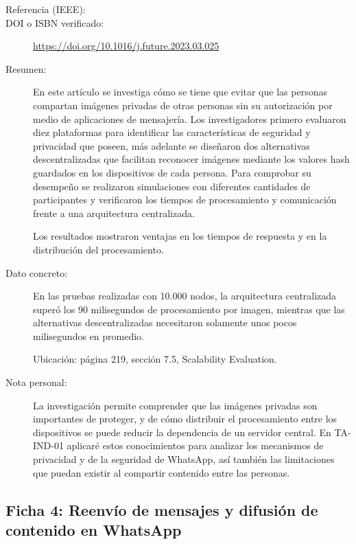 \begin{description}

\item[Referencia (IEEE):]

\item[DOI o ISBN verificado:]
\url{https://doi.org/10.1016/j.future.2023.03.025}

\item[Resumen:]
En este artículo se investiga cómo se tiene que evitar que las personas compartan imágenes privadas de otras personas sin su autorización por medio de aplicaciones de mensajería. Los investigadores primero evaluaron diez plataformas para identificar las características de seguridad y privacidad que poseen, más adelante se diseñaron dos alternativas descentralizadas que facilitan reconocer imágenes mediante los valores hash guardados en los dispositivos de cada persona. Para comprobar su desempeño se realizaron simulaciones con diferentes cantidades de participantes y verificaron los tiempos de procesamiento y comunicación frente a una arquitectura centralizada.

Los resultados mostraron ventajas en los tiempos de respuesta y en la distribución del procesamiento.

\item[Dato concreto:]
En las pruebas realizadas con 10.000 nodos, la arquitectura centralizada superó los 90 milisegundos de procesamiento por imagen, mientras que las alternativas descentralizadas necesitaron solamente unos pocos milisegundos en promedio.

Ubicación: página 219, sección 7.5, Scalability Evaluation.

\item[Nota personal:]
La investigación permite comprender que las imágenes privadas son importantes de proteger, y de cómo distribuir el procesamiento entre los dispositivos se puede reducir la dependencia de un servidor central. En TA-IND-01 aplicaré estos conocimientos para analizar los mecanismos de privacidad y de la seguridad de WhatsApp, así también las limitaciones que puedan existir al compartir contenido entre las personas.

\end{description}



\subsection{Ficha 4: Reenvío de mensajes y difusión de contenido en WhatsApp}

